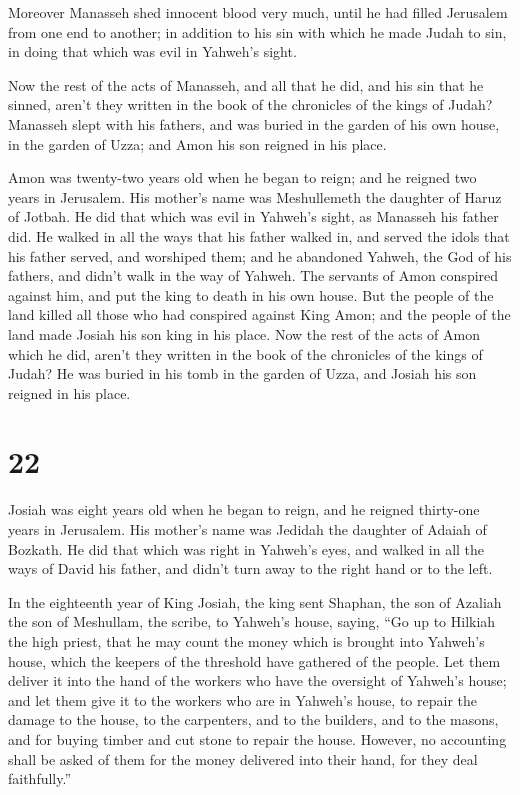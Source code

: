  Moreover Manasseh shed innocent blood very much, until
he had filled Jerusalem from one end to another; in addition to his sin
with which he made Judah to sin, in doing that which was evil in
Yahweh's sight.

 Now the rest of the acts of Manasseh, and all that he
did, and his sin that he sinned, aren't they written in the book of the
chronicles of the kings of Judah?  Manasseh slept with
his fathers, and was buried in the garden of his own house, in the
garden of Uzza; and Amon his son reigned in his place.

 Amon was twenty-two years old when he began to reign;
and he reigned two years in Jerusalem. His mother's name was
Meshullemeth the daughter of Haruz of Jotbah.  He did
that which was evil in Yahweh's sight, as Manasseh his father did.
 He walked in all the ways that his father walked in, and
served the idols that his father served, and worshiped them;
 and he abandoned Yahweh, the God of his fathers, and
didn't walk in the way of Yahweh.  The servants of Amon
conspired against him, and put the king to death in his own house.
 But the people of the land killed all those who had
conspired against King Amon; and the people of the land made Josiah his
son king in his place.  Now the rest of the acts of Amon
which he did, aren't they written in the book of the chronicles of the
kings of Judah?  He was buried in his tomb in the garden
of Uzza, and Josiah his son reigned in his place.

\hypertarget{section-21}{%
\section{22}\label{section-21}}

 Josiah was eight years old when he began to reign, and he
reigned thirty-one years in Jerusalem. His mother's name was Jedidah the
daughter of Adaiah of Bozkath.  He did that which was
right in Yahweh's eyes, and walked in all the ways of David his father,
and didn't turn away to the right hand or to the left.

 In the eighteenth year of King Josiah, the king sent
Shaphan, the son of Azaliah the son of Meshullam, the scribe, to
Yahweh's house, saying,  ``Go up to Hilkiah the high
priest, that he may count the money which is brought into Yahweh's
house, which the keepers of the threshold have gathered of the people.
 Let them deliver it into the hand of the workers who have
the oversight of Yahweh's house; and let them give it to the workers who
are in Yahweh's house, to repair the damage to the house, 
to the carpenters, and to the builders, and to the masons, and for
buying timber and cut stone to repair the house.  However,
no accounting shall be asked of them for the money delivered into their
hand, for they deal faithfully.''

